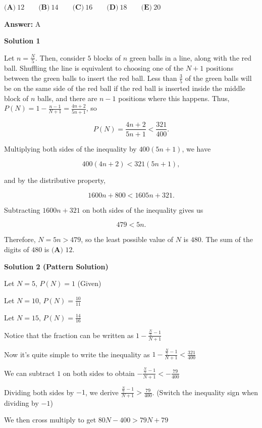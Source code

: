 \begin{enumerate}
 $\textbf{(A)}\ 12\qquad\textbf{(B)}\ 14\qquad\textbf{(C)}\ 16\qquad\textbf{(D)}\ 18\qquad\textbf{(E)}\ 20$

 \textbf{Answer: }A



\textbf{Solution 1}

Let $n = \frac{N}{5}$. Then, consider $5$ blocks of $n$ green balls in a line, along with the red ball. Shuffling the line is equivalent to choosing one of the $N + 1$ positions between the green balls to insert the red ball. Less than $\frac{3}{5}$ of the green balls will be on the same side of the red ball if the red ball is inserted inside the middle block of $n$ balls, and there are $n - 1$ positions where this happens. Thus, $P(N) = 1 - \frac{n - 1}{N + 1} = \frac{4n + 2}{5n + 1}$, so

 
 \[P(N) = \frac{4n + 2}{5n + 1} < \frac{321}{400}.\]

 Multiplying both sides of the inequality by $400(5n+1)$, we have

 
 \[400(4n+2)<321(5n+1),\]

 and by the distributive property,

 
 \[1600n+800<1605n+321.\]

 Subtracting $1600n+321$ on both sides of the inequality gives us

 
 \[479<5n.\]

 Therefore, $N=5n>479$, so the least possible value of $N$ is $480$. The sum of the digits of $480$ is $\boxed{\textbf{(A) } 12}$.

 



\textbf{Solution 2 (Pattern Solution)}

Let $N=5$, $P(N)=1$ (Given)

 
Let $N=10$, $P(N)=\frac{10}{11}$

 
Let $N=15$, $P(N)=\frac{14}{16}$

 
Notice that the fraction can be written as $1-\frac{\frac{N}{5}-1}{N+1}$

 Now it's quite simple to write the inequality as $1-\frac{\frac{N}{5}-1}{N+1}<\frac{321}{400}$

 We can subtract $1$ on both sides to obtain $-\frac{\frac{N}{5}-1}{N+1}<-\frac{79}{400}$

 Dividing both sides by $-1$, we derive $\frac{\frac{N}{5}-1}{N+1}>\frac{79}{400}$. (Switch the inequality sign when dividing by $-1$)

 We then cross multiply to get $80N - 400 > 79N + 79$


\end{enumerate}
